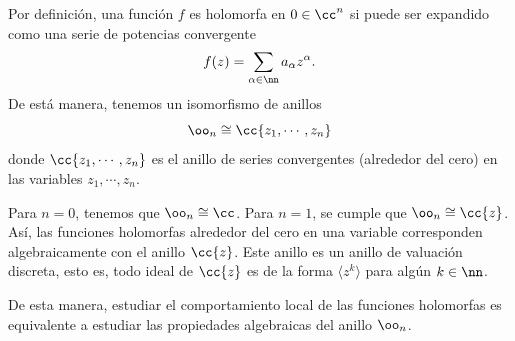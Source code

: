 	\begin{remark}
		Por definición, una función $f$ es holomorfa en $0\in\cc^n$ si puede ser expandido como una serie de potencias convergente 
		\begin{equation*}
			f(z)=\sum_{\alpha\in\nn}a_\alpha z^\alpha.
		\end{equation*}
		De está manera, tenemos un isomorfismo de anillos 
		\begin{equation*}
			\oo_{n}\cong \cc\{z_1,\cdots,z_n\}
		\end{equation*}
		donde $\cc\{z_1,\cdots,z_n\}$ es el anillo de series convergentes (alrededor del cero) en las variables $z_1,\cdots,z_n$.
	\end{remark}

	\begin{example}
		Para $n=0$, tenemos que $\oo_{n}\cong\cc$. Para $n=1$, se cumple que $\oo_{n}\cong\cc\{z\}$. Así, las funciones holomorfas alrededor del cero en una variable corresponden algebraicamente con el anillo $\cc\{z\}$. Este anillo es un anillo de valuación discreta, esto es, todo ideal de $\cc\{z\}$ es de la forma $\langle z^k \rangle$ para algún $k\in\nn$.
	\end{example}
	
	De esta manera, estudiar el comportamiento local de las funciones holomorfas es equivalente a estudiar las propiedades algebraicas del anillo $\oo_{n}$.
	

